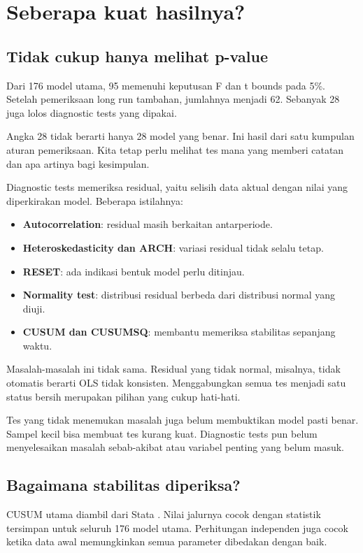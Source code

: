 \section{Seberapa kuat hasilnya?}\label{sec:diagnostics}
\subsection{Tidak cukup hanya melihat p-value}
Dari 176 model utama, 95 memenuhi keputusan F dan t bounds pada 5\%. Setelah pemeriksaan long run tambahan, jumlahnya menjadi 62. Sebanyak 28 juga lolos diagnostic tests yang dipakai.

Angka 28 tidak berarti hanya 28 model yang benar. Ini hasil dari satu kumpulan aturan pemeriksaan. Kita tetap perlu melihat tes mana yang memberi catatan dan apa artinya bagi kesimpulan.

Diagnostic tests memeriksa residual, yaitu selisih data aktual dengan nilai yang diperkirakan model. Beberapa istilahnya:
\begin{itemize}
\item \textbf{Autocorrelation}: residual masih berkaitan antarperiode.
\item \textbf{Heteroskedasticity dan ARCH}: variasi residual tidak selalu tetap.
\item \textbf{RESET}: ada indikasi bentuk model perlu ditinjau.
\item \textbf{Normality test}: distribusi residual berbeda dari distribusi normal yang diuji.
\item \textbf{CUSUM dan CUSUMSQ}: membantu memeriksa stabilitas sepanjang waktu.
\end{itemize}

Masalah-masalah ini tidak sama. Residual yang tidak normal, misalnya, tidak otomatis berarti OLS tidak konsisten. Menggabungkan semua tes menjadi satu status bersih merupakan pilihan yang cukup hati-hati.

Tes yang tidak menemukan masalah juga belum membuktikan model pasti benar. Sampel kecil bisa membuat tes kurang kuat. Diagnostic tests pun belum menyelesaikan masalah sebab-akibat atau variabel penting yang belum masuk.

\subsection{Bagaimana stabilitas diperiksa?}
CUSUM utama diambil dari Stata \cite{stata}. Nilai jalurnya cocok dengan statistik tersimpan untuk seluruh 176 model utama. Perhitungan independen juga cocok ketika data awal memungkinkan semua parameter dibedakan dengan baik.


